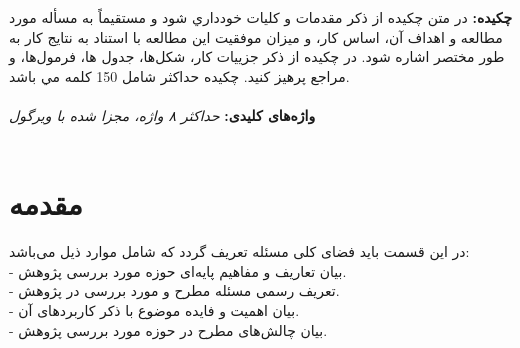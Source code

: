 \thispagestyle{empty}
\noindent
\renewcommand*\thesection{\arabic{section}}
\textbf{\large{چکیده:}}
در متن  چکيده از ذكر مقدمات و كليات خودداري شود و مستقيماً به مسأله مورد مطالعه و اهداف آن، اساس كار، و ميزان موفقيت اين مطالعه با استناد به نتايج كار به طور مختصر اشاره شود. در چكيده از ذكر جزييات كار، شكل‌ها، جدول ها، فرمول‌ها، و مراجع‌ پرهيز كنيد. چکيده حداكثر شامل 150 كلمه مي باشد.\\\\
\textbf{واژه‌های کلیدی:}\textit{ حداكثر ٨ واژه، مجزا شده با ويرگول}\\\\
\section{مقدمه}
\label{sec:intro}
در این قسمت باید فضای کلی مسئله تعریف گردد که شامل موارد ذیل می‌باشد:\\
- بیان تعاریف و مفاهیم پایه‌ای حوزه مورد بررسی پژوهش.\\
- تعريف رسمی مسئله مطرح و مورد بررسی در پژوهش.\\
- بیان اهمیت و فایده موضوع با ذکر کاربردهای آن.\\
- بیان چالش‌های مطرح در حوزه مورد بررسی پژوهش.\\
 
